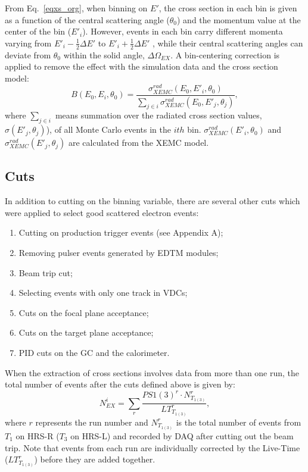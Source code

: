   From Eq.~\eqref{eqxs_org}, when binning on $E'$, the cross section in each bin is given as a function of the central scattering angle ($\theta_{0}$) and the momentum value at the center of the bin ($E'_{i}$). However, events in each bin carry different momenta varying from $E'_{i}-\frac{1}{2}\Delta E'$ to $E'_{i}+\frac{1}{2}\Delta E'$ , while their central scattering angles can deviate from $\theta_{0}$ within the solid angle, $\Delta \Omega_{EX}$. A bin-centering correction is applied to remove the effect with the simulation data and the cross section model:
\begin{equation}
 B(E_{0},E_{i}, \theta_{0}) = \frac{\sigma^{rad}_{XEMC}(E_{0},E'_{i},\theta_{0})}{\sum_{j\in i}\sigma^{rad}_{XEMC}(E_{0},E'_{j},\theta_{j})},
  \label{bin_corr}  
\end{equation}
where $\sum_{j\in i}$ means summation over the radiated cross section values, $\sigma(E'_{j},\theta_{j})$), of all Monte Carlo events in the $ith$ bin. $\sigma^{rad}_{XEMC}(E'_{i},\theta_{0})$ and $\sigma^{rad}_{XEMC}(E'_{j},\theta_{j})$ are calculated from the XEMC model.

\subsection{Cuts}
In addition to cutting on the binning variable, there are several other cuts which were applied to select good scattered electron events:
\begin{enumerate}
\item Cutting on production trigger events (see Appendix A);
\item Removing pulser events generated by EDTM modules;
\item Beam trip cut;
\item Selecting events with only one track in VDCs; 
\item Cuts on the focal plane acceptance;
\item Cuts on the target plane acceptance;
\item PID cuts on the GC and the calorimeter.
\end{enumerate}

 When the extraction of cross sections involves data from more than one run, the total number of events after the cuts defined above is given by:
\begin{equation}
  N_{EX}^{i} = \sum_{r} \frac{PS1(3)^{r}\cdot N_{T_{1(3)}}^{r}}{LT_{T_{1(3)}}^{r}},
  \label{eq_nex}
\end{equation}
where $r$ represents the run number and $N_{T_{1(3)}}^{r}$ is the total number of events from $T_{1}$ on HRS-R ($T_{3}$ on HRS-L) and recorded by DAQ after cutting out the beam trip. Note that events from each run are individually corrected by the Live-Time ($LT_{T_{1(3)}}^{r}$) before they are added together.

